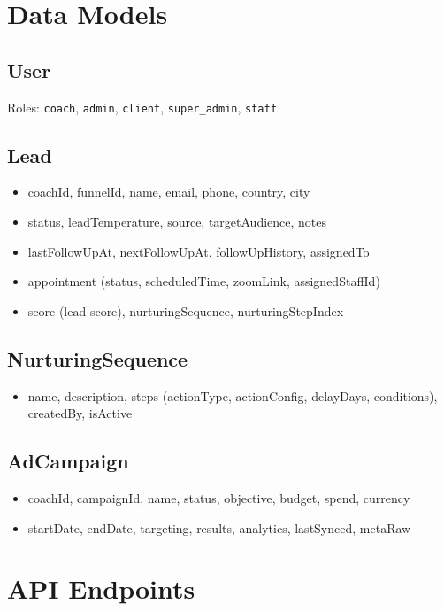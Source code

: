 \documentclass[11pt,a4paper]{article}
\begin{document}
\section{Data Models}
\subsection{User}
Roles: \texttt{coach}, \texttt{admin}, \texttt{client}, \texttt{super\_admin}, \texttt{staff}

\subsection{Lead}
\begin{itemize}
  \item coachId, funnelId, name, email, phone, country, city
  \item status, leadTemperature, source, targetAudience, notes
  \item lastFollowUpAt, nextFollowUpAt, followUpHistory, assignedTo
  \item appointment (status, scheduledTime, zoomLink, assignedStaffId)
  \item score (lead score), nurturingSequence, nurturingStepIndex
\end{itemize}

\subsection{NurturingSequence}
\begin{itemize}
  \item name, description, steps (actionType, actionConfig, delayDays, conditions), createdBy, isActive
\end{itemize}

\subsection{AdCampaign}
\begin{itemize}
  \item coachId, campaignId, name, status, objective, budget, spend, currency
  \item startDate, endDate, targeting, results, analytics, lastSynced, metaRaw
\end{itemize}

\section{API Endpoints}
\end{document}

